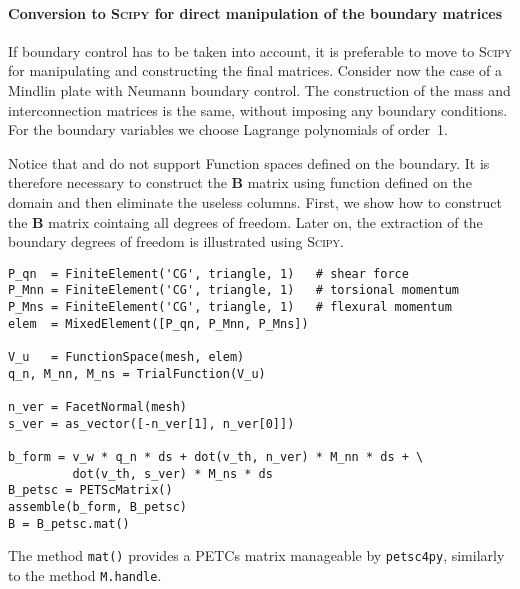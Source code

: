 \paragraph{Conversion to \textsc{Scipy} for direct manipulation of the boundary matrices}
If boundary control has to be taken into account, it is preferable to move to \textsc{Scipy} for manipulating and constructing the final matrices. Consider now the case of a Mindlin plate with Neumann boundary control. The construction of the mass and interconnection matrices is the same, without imposing any boundary conditions. For the boundary variables we choose Lagrange polynomials of order~1. 

\begin{remark}\label{rmk:Bmatrix}
Notice that \fenics and \firedrake do not support Function spaces defined on the boundary. It is therefore necessary to construct the $\mathbf{B}$ matrix using function defined on the domain and then eliminate the useless columns. First, we show how to construct the $\mathbf{B}$ matrix cointaing all degrees of freedom. Later on, the extraction of the boundary degrees of freedom is illustrated using \textsc{Scipy}. 
\end{remark}

\begin{tcolorbox}[title = Control matrix construction in  \fenics, coltitle=black, breakable, size=fbox, boxrule=1pt, pad at break*=1mm, colframe=red, enlarge top by=0.25em, enlarge bottom by=0.5em]
\begin{Verbatim}[tabsize=4]
P_qn  = FiniteElement('CG', triangle, 1)   # shear force
P_Mnn = FiniteElement('CG', triangle, 1)   # torsional momentum
P_Mns = FiniteElement('CG', triangle, 1)   # flexural momentum
elem  = MixedElement([P_qn, P_Mnn, P_Mns])
 
V_u   = FunctionSpace(mesh, elem)
q_n, M_nn, M_ns = TrialFunction(V_u)

n_ver = FacetNormal(mesh)  
s_ver = as_vector([-n_ver[1], n_ver[0]])

b_form = v_w * q_n * ds + dot(v_th, n_ver) * M_nn * ds + \
		 dot(v_th, s_ver) * M_ns * ds	 
B_petsc = PETScMatrix()
assemble(b_form, B_petsc)
B = B_petsc.mat()
\end{Verbatim}
\end{tcolorbox}	
The method \verb|mat()| provides a PETCs matrix manageable by \verb|petsc4py|, similarly to the method \verb|M.handle|.

